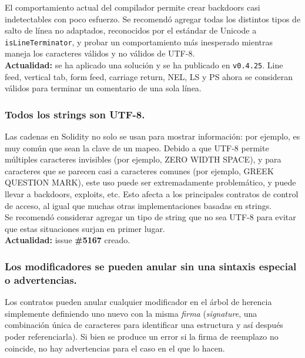 El comportamiento actual del compilador permite crear backdoors casi indetectables con poco esfuerzo. Se recomendó agregar todas los distintos tipos de salto de línea no adaptados, reconocidos por el estándar de Unicode\cite{UnicodeLineBreaking} a \verb|isLineTerminator|, y probar un comportamiento más inesperado mientras maneja los caracteres válidos y no válidos de UTF-8.\\

\textbf{Actualidad:} se ha aplicado una solución\cite{GHPR4937} y se ha publicado en \verb|v0.4.25|. Line feed, vertical tab, form feed, carriage return, NEL, LS y PS ahora se consideran válidos para terminar un comentario de una sola línea.\\


\subsubsection{Todos los strings son UTF-8.}
Las cadenas en Solidity no solo se usan para mostrar información: por ejemplo, es muy común que sean la clave de un mapeo. Debido a que UTF-8 permite múltiples caracteres invisibles (por ejemplo, ZERO WIDTH SPACE\cite{UnicodeZeroWidth}), y para caracteres que se parecen casi a caracteres comunes (por ejemplo, GREEK QUESTION MARK\cite{UnicodeGreekQuestion}), este uso puede ser extremadamente problemático, y puede llevar a backdoors, exploits, etc. Esto afecta a los principales contratos de control de acceso\cite{OpenZeppelinGHRBAC}, al igual que muchas otras implementaciones basadas en strings.\\

Se recomendó considerar agregar un tipo de string que no sea UTF-8 para evitar que estas situaciones surjan en primer lugar.\\

\textbf{Actualidad:} issue \textbf{\#5167}\cite{GHI5167} creado.\\

\subsubsection{Los modificadores se pueden anular sin una sintaxis especial o advertencias.}

Los contratos pueden anular cualquier modificador en el árbol de herencia simplemente definiendo uno nuevo con la misma \textit{firma} (\textit{signature}, una combinación única de caracteres para identificar una estructura y así después poder referenciarla). Si bien se produce un error si la firma de reemplazo no coincide, no hay advertencias para el caso en el que lo hacen.

